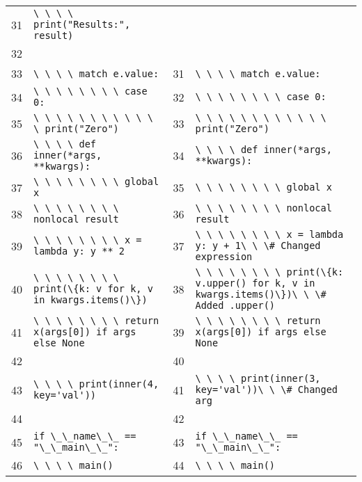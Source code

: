 \documentclass{article}
\newcommand{\code}[1]{\lstinline[style=diffcode]!#1!}
\begin{document}
\begin{tabularx}{\linewidth}{r X r X}
\cellcolor{remred}31 & \cellcolor{remred}\code{\ \ \ \ print("Results:", result)} &  &  \\
\cellcolor{remred}32 & \cellcolor{remred}\code{} &  &  \\
33 & \code{\ \ \ \ match e.value:} & 31 & \code{\ \ \ \ match e.value:} \\
34 & \code{\ \ \ \ \ \ \ \ case 0:} & 32 & \code{\ \ \ \ \ \ \ \ case 0:} \\
35 & \code{\ \ \ \ \ \ \ \ \ \ \ \ print("Zero")} & 33 & \code{\ \ \ \ \ \ \ \ \ \ \ \ print("Zero")} \\
36 & \code{\ \ \ \ def inner(*args, **kwargs):} & 34 & \code{\ \ \ \ def inner(*args, **kwargs):} \\
37 & \code{\ \ \ \ \ \ \ \ global x} & 35 & \code{\ \ \ \ \ \ \ \ global x} \\
38 & \code{\ \ \ \ \ \ \ \ nonlocal result} & 36 & \code{\ \ \ \ \ \ \ \ nonlocal result} \\
\cellcolor{remred}39 & \cellcolor{remred}\code{\ \ \ \ \ \ \ \ x = lambda y: y ** 2} & \cellcolor{addgreen}37 & \cellcolor{addgreen}\code{\ \ \ \ \ \ \ \ x = lambda y: y + 1\ \ \# Changed expression} \\
\cellcolor{remred}40 & \cellcolor{remred}\code{\ \ \ \ \ \ \ \ print(\{k: v for k, v in kwargs.items()\})} & \cellcolor{addgreen}38 & \cellcolor{addgreen}\code{\ \ \ \ \ \ \ \ print(\{k: v.upper() for k, v in kwargs.items()\})\ \ \# Added .upper()} \\
41 & \code{\ \ \ \ \ \ \ \ return x(args[0]) if args else None} & 39 & \code{\ \ \ \ \ \ \ \ return x(args[0]) if args else None} \\
42 & \code{} & 40 & \code{} \\
\cellcolor{remred}43 & \cellcolor{remred}\code{\ \ \ \ print(inner(4, key='val'))} & \cellcolor{addgreen}41 & \cellcolor{addgreen}\code{\ \ \ \ print(inner(3, key='val'))\ \ \# Changed arg} \\
44 & \code{} & 42 & \code{} \\
45 & \code{if \_\_name\_\_ == "\_\_main\_\_":} & 43 & \code{if \_\_name\_\_ == "\_\_main\_\_":} \\
46 & \code{\ \ \ \ main()} & 44 & \code{\ \ \ \ main()} \\
\hline
\end{tabularx}
\end{document}
